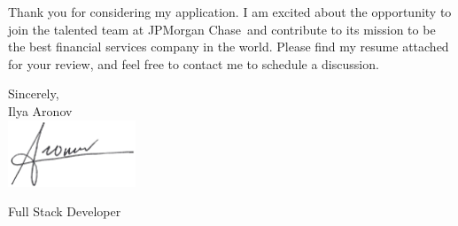 \documentclass[11pt]{letter}
\def\myname{Ilya Aronov}
\def\mytitle{Full Stack Developer}
\def\companyName{JPMorgan Chase}
\def\companyMission{to be the best financial services company in the world}
\begin{document}
Thank you for considering my application. I am excited about the opportunity to join the talented team at \companyName\, and contribute to its mission \companyMission.
Please find my resume attached for your review, and feel free to contact me to schedule a discussion.


\vspace{0.1in}
\vfill

\begin{flushright}

\vspace{-0.1in}
Sincerely, \\
\myname\\

\includegraphics[width=1.5in]{signiture_no_background.png}

\vspace{-0.1in}
\mytitle

\end{flushright}
\end{document}
